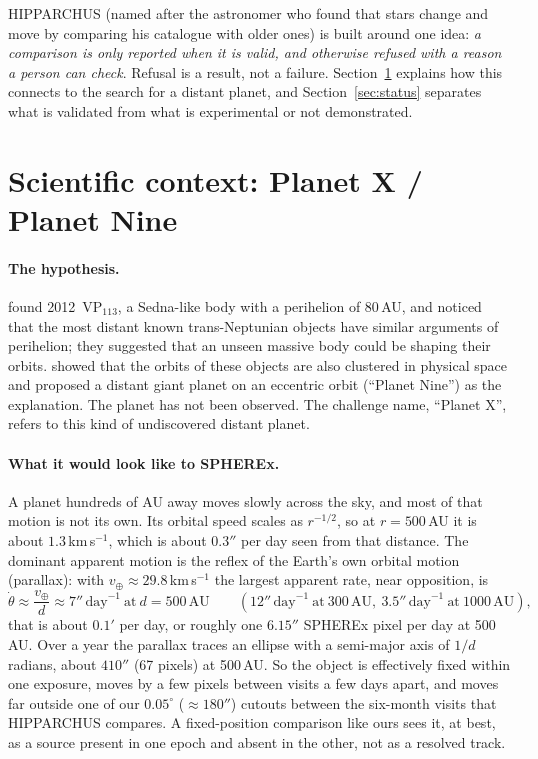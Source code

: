 \documentclass[11pt,a4paper]{article}
\begin{document}
HIPPARCHUS (named after the astronomer who found that stars change and move by comparing his catalogue with older
ones) is built around one idea: \emph{a comparison is only reported when it is valid, and otherwise refused with a
reason a person can check}. Refusal is a result, not a failure.
Section~\ref{sec:planetx} explains how this connects to the search for a distant planet, and
Section~\ref{sec:status} separates what is validated from what is experimental or not demonstrated.

\section{Scientific context: Planet X / Planet Nine}\label{sec:planetx}
\paragraph{The hypothesis.} \textcite{trujillo2014} found 2012~VP$_{113}$, a Sedna-like body with a perihelion of
80\,AU, and noticed that the most distant known trans-Neptunian objects have similar arguments of perihelion; they
suggested that an unseen massive body could be shaping their orbits. \textcite{batygin2016} showed that the orbits of
these objects are also clustered in physical space and proposed a distant giant planet on an eccentric orbit
(``Planet Nine'') as the explanation. The planet has not been observed. The challenge name, ``Planet X'', refers to
this kind of undiscovered distant planet.

\paragraph{What it would look like to SPHEREx.} A planet hundreds of AU away moves slowly across the sky, and most of
that motion is not its own. Its orbital speed scales as $r^{-1/2}$, so at $r=500$\,AU it is about $1.3$\,km\,s$^{-1}$,
which is about $0.3''$ per day seen from that distance. The dominant apparent motion is the reflex of the Earth's own
orbital motion (parallax): with $v_\oplus\approx29.8$\,km\,s$^{-1}$ the largest apparent rate, near opposition, is
\begin{equation*}
\dot\theta \approx \frac{v_\oplus}{d} \approx 7''\,\mathrm{day}^{-1}\ \text{at}\ d=500\,\mathrm{AU}
\qquad(12''\,\mathrm{day}^{-1}\ \text{at}\ 300\,\mathrm{AU},\ 3.5''\,\mathrm{day}^{-1}\ \text{at}\ 1000\,\mathrm{AU}),
\end{equation*}
that is about $0.1'$ per day, or roughly one $6.15''$ SPHEREx pixel per day at 500\,AU. Over a year the parallax traces
an ellipse with a semi-major axis of $1/d$ radians, about $410''$ (67 pixels) at 500\,AU. So the object is effectively
fixed within one exposure, moves by a few pixels between visits a few days apart, and moves far outside one of our
$0.05^\circ$ ($\approx180''$) cutouts between the six-month visits that HIPPARCHUS compares. A fixed-position comparison like
ours sees it, at best, as a source present in one epoch and absent in the other, not as a resolved track.
\end{document}
